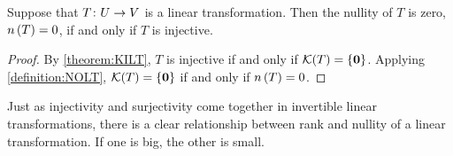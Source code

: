 \documentclass{ximera}
\begin{document}
\begin{theorem}
\label{theorem:NOILT}


Suppose that $T\colon U\rightarrow V$ is a linear transformation.  Then the nullity of $T$ is zero, $n\left(T\right)=0$, if and only if $T$ is injective.





\begin{proof}
By \ref{theorem:KILT}, $T$ is injective if and only if $\mathcal{K}\!\left(T\right)=\left\{\mathbf{0}\right\}$.  Applying \ref{definition:NOLT}, $\mathcal{K}\!\left(T\right)=\left\{\mathbf{0}\right\}$ if and only if $n\left(T\right)=0$.



\end{proof}
\end{theorem}

Just as injectivity and surjectivity come together in invertible linear transformations, there is a clear relationship between rank and nullity of a linear transformation.  If one is big, the other is small.
\end{document}
